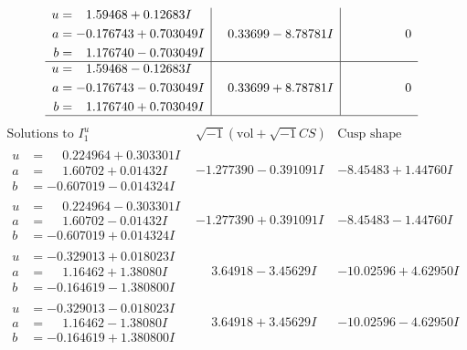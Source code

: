 \documentclass[1p]{elsarticle_modified}
\theoremstyle{definition}
\newcommand{\I}{\sqrt{-1}}
\begin{document}
$$\begin{array}{c|c|c}
\begin{aligned}
u &= \phantom{-}1.59468 + 0.12683 I \\
a &= -0.176743 + 0.703049 I \\
b &= \phantom{-}1.176740 - 0.703049 I\end{aligned}
 & \phantom{-}0.33699 - 8.78781 I & \phantom{-0.000000 } 0 \\ \hline\begin{aligned}
u &= \phantom{-}1.59468 - 0.12683 I \\
a &= -0.176743 - 0.703049 I \\
b &= \phantom{-}1.176740 + 0.703049 I\end{aligned}
 & \phantom{-}0.33699 + 8.78781 I & \phantom{-0.000000 } 0\\
 \hline 
 \end{array}$$\newpage$$\begin{array}{c|c|c}  
\text{Solutions to }I^u_{1}& \I (\text{vol} + \sqrt{-1}CS) & \text{Cusp shape}\\
 \hline 
\begin{aligned}
u &= \phantom{-}0.224964 + 0.303301 I \\
a &= \phantom{-}1.60702 + 0.01432 I \\
b &= -0.607019 - 0.014324 I\end{aligned}
 & -1.277390 - 0.391091 I & -8.45483 + 1.44760 I \\ \hline\begin{aligned}
u &= \phantom{-}0.224964 - 0.303301 I \\
a &= \phantom{-}1.60702 - 0.01432 I \\
b &= -0.607019 + 0.014324 I\end{aligned}
 & -1.277390 + 0.391091 I & -8.45483 - 1.44760 I \\ \hline\begin{aligned}
u &= -0.329013 + 0.018023 I \\
a &= \phantom{-}1.16462 + 1.38080 I \\
b &= -0.164619 - 1.380800 I\end{aligned}
 & \phantom{-}3.64918 - 3.45629 I & -10.02596 + 4.62950 I \\ \hline\begin{aligned}
u &= -0.329013 - 0.018023 I \\
a &= \phantom{-}1.16462 - 1.38080 I \\
b &= -0.164619 + 1.380800 I\end{aligned}
 & \phantom{-}3.64918 + 3.45629 I & -10.02596 - 4.62950 I \\ \hline\begin{aligned}

\end{aligned}
\end{array}$$
\end{document}
